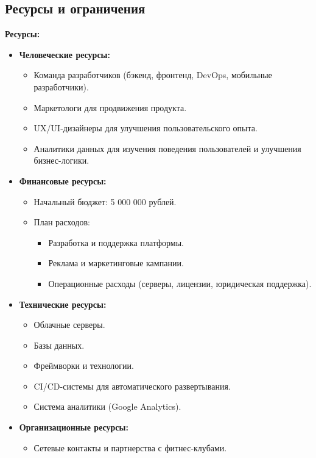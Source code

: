 \documentclass[14pt, russian]{matmex-diploma-custom}
\begin{document}
\subsection{Ресурсы и ограничения}
\textbf{Ресурсы:}
\begin{itemize}
    \item \textbf{Человеческие ресурсы:}
    \begin{itemize}
        \item Команда разработчиков (бэкенд, фронтенд, DevOps, мобильные разработчики).
        \item Маркетологи для продвижения продукта.
        \item UX/UI-дизайнеры для улучшения пользовательского опыта.
        \item Аналитики данных для изучения поведения пользователей и улучшения бизнес-логики.
    \end{itemize}

    \item \textbf{Финансовые ресурсы:}
    \begin{itemize}
        \item Начальный бюджет: 5 000 000 рублей.
        \item План расходов:
            \begin{itemize}
                \item Разработка и поддержка платформы.
                \item Реклама и маркетинговые кампании.
                \item Операционные расходы (серверы, лицензии, юридическая поддержка).
            \end{itemize}
    \end{itemize}

    \item \textbf{Технические ресурсы:}
    \begin{itemize}
        \item Облачные серверы.
        \item Базы данных.
        \item Фреймворки и технологии.
        \item CI/CD-системы для автоматического развертывания.
        \item Система аналитики (Google Analytics).
    \end{itemize}

    \item \textbf{Организационные ресурсы:}
    \begin{itemize}
        \item Сетевые контакты и партнерства с фитнес-клубами.
    \end{itemize}
\end{itemize}
\end{document}
